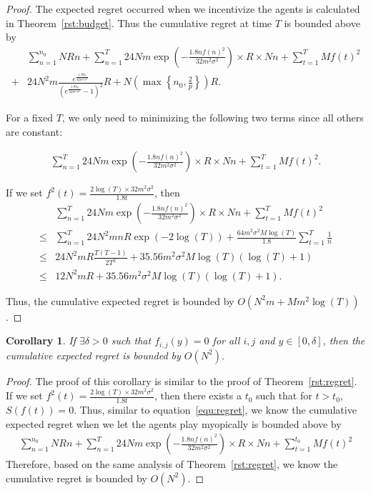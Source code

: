 \documentclass{article}
\newtheorem{corollary}{Corollary}
\begin{document}
\begin{proof}
The expected regret occurred when we incentivize the agents is calculated in Theorem~\ref{rst:budget}. Thus the cumulative regret at time $T$ is bounded above by
\begin{align}
&\sum_{n=1}^{n_{0}}NRn + \sum_{n=1}^{T} 24Nm\exp\left(-\frac{1.8n f(n)^2}{32 m^2\sigma^2}\right)\times R \times Nn+ \sum_{t=1}^{T}Mf(t)^2 \nonumber \\
+ & 24N^2 m \frac{e^{\frac{1.8\delta_{0}}{32m^2\sigma^2}}}{(e^{\frac{1.8\delta_{0}}{32m^2\sigma^2}}-1)^2}R+N\left(\max\left\{n_{0},\frac{2}{p}\right\}\right)R. \nonumber
\end{align}

For a fixed $T$, we only need to minimizing the following two terms since all others are constant:

\begin{align}
\sum_{n=1}^{T} 24Nm\exp\left(-\frac{1.8n f(n)^2}{32 m^2\sigma^2}\right)\times R \times Nn+ \sum_{t=1}^{T}Mf(t)^2.
\end{align}


If we set $f^2(t)=\frac{2\log(T)\times 32m^2\sigma^2}{1.8t}$, then
\begin{align}
&\sum_{n=1}^{T} 24Nm\exp\left(-\frac{1.8n f(n)^2}{32 m^2\sigma^2}\right)\times R \times Nn+ \sum_{t=1}^{T}Mf(t)^2 \nonumber \\ 
\leq & \sum_{n=1}^{T} 24N^2 mnR \exp\left(-2\log(T)\right)  + \frac{64m^2\sigma^2 M\log(T)}{1.8}\sum_{t=1}^{T}\frac{1}{n} \nonumber \\
\leq &  24N^2 m R\frac{T(T-1)}{2T^2}  + 35.56 m^2\sigma^2 M\log(T)(\log(T)+1) \nonumber \\
\leq &  12 N^2 m R  + 35.56 m^2\sigma^2 M\log(T)(\log(T)+1). \nonumber
\end{align}

Thus, the cumulative expected regret is bounded by $O(N^2 m + M m^2\log(T))$.
\end{proof}

\begin{corollary}
If $\exists \delta>0$ such that $f_{i,j}(y)=0$ for all $i,j$ and $y\in [0,\delta]$, then the cumulative expected regret is bounded by $O(N^2)$.
\end{corollary}

\begin{proof}
The proof of this corollary is similar to the proof of Theorem~\ref{rst:regret}. If we set $f^2(t)=\frac{2\log(T)\times 32m^2\sigma^2}{1.8t}$, then there exists a $t_{0}$ such that for $t>t_{0}$, $S(f(t))=0$. Thus, similar to equation~\eqref{equ:regret}, we know the cumulative expected regret when we let the agents play myopically is bounded above by
\begin{align}
\sum_{n=1}^{n_{0}}NRn + \sum_{n=1}^{T} 24Nm\exp\left(-\frac{1.8n f(n)^2}{32 m^2\sigma^2}\right)\times R \times Nn+ \sum_{t=1}^{t_{0}}Mf(t)^2 \nonumber
\end{align}
Therefore, based on the same analysis of Theorem~\ref{rst:regret}, we know the cumulative regret is bounded by $O(N^2)$.
\end{proof}
\end{document}
